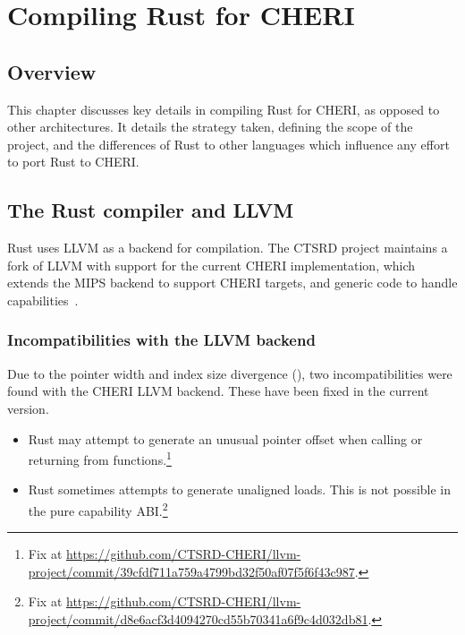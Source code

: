 \documentclass[dissertation.tex]{subfiles}
\begin{document}
\chapter{Compiling Rust for CHERI}
\label{ch:impl}


\section{Overview}

This chapter discusses key details in compiling Rust for CHERI, as
opposed to other architectures.
It details the strategy taken, defining the scope of the project, and
the differences of Rust to other languages which influence any effort to
port Rust to CHERI.


\section{The Rust compiler and LLVM}
\label{sec:impl-rustllvm}

Rust uses LLVM as a backend for compilation.
The CTSRD project maintains a fork of LLVM with support for the
current CHERI implementation, which extends the MIPS backend to
support CHERI targets, and generic code to handle
capabilities~\cite{cheri-prog-guide}.

\subsection{Incompatibilities with the LLVM backend}
Due to the pointer width and index size divergence
(), two incompatibilities were found with the CHERI
LLVM backend.
These have been fixed in the current version.

\begin{itemize}
    \item Rust may attempt to generate an unusual pointer offset when
    calling or returning from functions.\footnote{Fix at \url{https://github.com/CTSRD-CHERI/llvm-project/commit/39cfdf711a759a4799bd32f50af07f5f6f43c987}.}
    \item Rust sometimes attempts to generate unaligned loads.
    This is not possible in the pure capability ABI.\footnote{Fix at \url{https://github.com/CTSRD-CHERI/llvm-project/commit/d8e6acf3d4094270cd55b70341a6f9c4d032db81}.}
\end{itemize}
\end{document}
